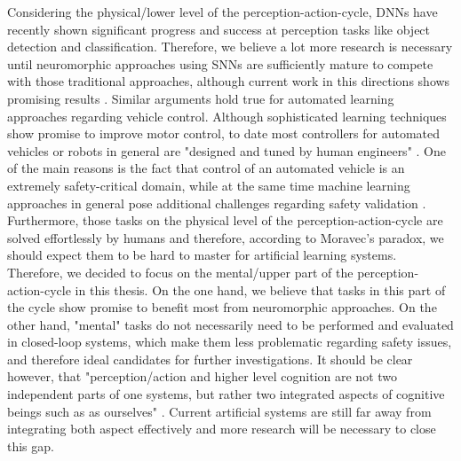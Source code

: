 Considering the physical/lower level of the perception-action-cycle, \acp{DNN} have recently shown significant progress and success at perception tasks like object detection and classification.
Therefore, we believe a lot more research is necessary until neuromorphic approaches using \acp{SNN} are sufficiently mature to compete with those traditional approaches, although current work in this directions shows promising results \citep{Hunsberger2015}.
Similar arguments hold true for automated learning approaches regarding vehicle control.
Although sophisticated learning techniques show promise to improve motor control, to date most controllers for automated vehicles or robots in general are "designed and tuned by human engineers" \citep{Deisenroth2013}.
One of the main reasons is the fact that control of an automated vehicle is an extremely safety-critical domain, while at the same time machine learning approaches in general pose additional challenges regarding safety validation \citep{Koopman2016}.
Furthermore, those tasks on the physical level of the perception-action-cycle are solved effortlessly by humans and therefore, according to Moravec's paradox, we should expect them to be hard to master for artificial learning systems.
Therefore, we decided to focus on the mental/upper part of the perception-action-cycle in this thesis.
On the one hand, we believe that tasks in this part of the cycle show promise to benefit most from neuromorphic approaches.
On the other hand, "mental" tasks do not necessarily need to be performed and evaluated in closed-loop systems, which make them less problematic regarding safety issues, and therefore ideal candidates for further investigations.
It should be clear however, that "perception/action and higher level cognition are not two independent parts of one systems, but rather two integrated aspects of cognitive beings such as as ourselves" \citep{Eliasmith2013}.
Current artificial systems are still far away from integrating both aspect effectively and more research will be necessary to close this gap.

